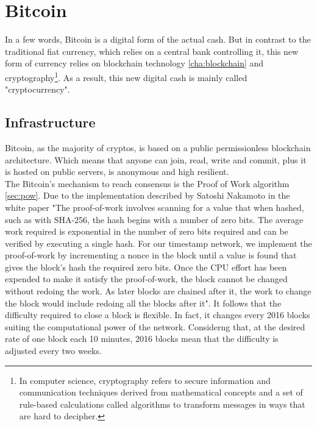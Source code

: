 \chapter{Bitcoin}
\label{cha:bitcoin}

In a few words, Bitcoin is a digital form of the actual cash. But in contrast to the 
traditional fiat currency, which relies on a central bank controlling it, this new
form of currency relies on blockchain technology \ref{cha:blockchain} and 
cryptography\footnote{In computer science, cryptography refers to secure information and communication techniques derived from mathematical concepts and a set of rule-based calculations called algorithms to transform messages in ways that are hard to decipher.}.
As a result, this new digital cash is mainly called "cryptocurrency".

\section{Infrastructure}
\label{sec:Infrastructure}

Bitcoin, as the majority of cryptos, is based on a public permissionless blockchain architecture.
Which means that anyone can join, read, write and commit, plus it is hosted on public 
servers, is anonymous and high resilient. \\
The Bitcoin's mechanism to reach consensus is the Proof of Work algorithm \ref{sec:pow}.
Due to the implementation described by Satoshi Nakamoto in the white paper "The proof-of-work 
involves scanning for a value that when hashed, such as with SHA-256, the hash begins 
with a number of zero bits. The average work required is exponential in the number of 
zero bits required and can be verified by executing a single hash. For our timestamp 
network, we implement the proof-of-work by incrementing a nonce in the block until a 
value is found that gives the block's hash the required zero bits.   
Once the CPU effort   has   been   expended   to   make   it   satisfy   the   
proof-of-work,   the   block   cannot   be   changed without  redoing  the   work.    
As   later   blocks   are  chained   after  it,   the  work  to  change  the  
block would include redoing all the blocks after it"\cite{bitcoin}. It follows 
that the difficulty required to close a block is flexible. In fact, it changes every 
2016 blocks suiting the computational power of the network. Considerng that, at the 
desired rate of one block each 10 minutes, 2016
blocks mean that the difficulty is adjusted every two weeks.

